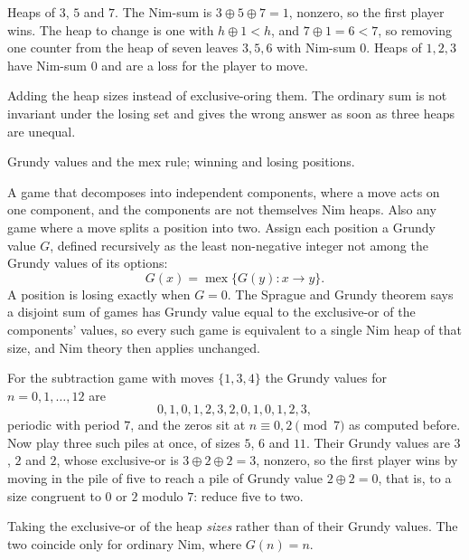 \begin{worked}
Heaps of $3$, $5$ and $7$. The Nim-sum is $3\oplus5\oplus7=1$, nonzero, so the first player wins. The heap to change is one with $h\oplus1<h$, and $7\oplus1=6<7$, so removing one counter from the heap of seven leaves $3,5,6$ with Nim-sum $0$. Heaps of $1,2,3$ have Nim-sum $0$ and are a loss for the player to move.
\end{worked}

\begin{trap}
Adding the heap sizes instead of exclusive-oring them. The ordinary sum is not invariant under the losing set and gives the wrong answer as soon as three heaps are unequal.
\end{trap}

\begin{seealsob}Grundy values and the mex rule; winning and losing positions.\end{seealsob}

\cue A game that decomposes into independent components, where a move acts on one component, and the components are not themselves Nim heaps. Also any game where a move splits a position into two.
\method Assign each position a Grundy value $G$, defined recursively as the least non-negative integer not among the Grundy values of its options:
\[
G(x)=\operatorname{mex}\{G(y): x\to y\}.
\]
A position is losing exactly when $G=0$. The Sprague and Grundy theorem says a disjoint sum of games has Grundy value equal to the exclusive-or of the components' values, so every such game is equivalent to a single Nim heap of that size, and Nim theory then applies unchanged.

\begin{worked}
For the subtraction game with moves $\{1,3,4\}$ the Grundy values for $n=0,1,\ldots,12$ are
\[
0,1,0,1,2,3,2,0,1,0,1,2,3,
\]
periodic with period $7$, and the zeros sit at $n\equiv0,2\pmod7$ as computed before. Now play three such piles at once, of sizes $5$, $6$ and $11$. Their Grundy values are $3$, $2$ and $2$, whose exclusive-or is $3\oplus2\oplus2=3$, nonzero, so the first player wins by moving in the pile of five to reach a pile of Grundy value $2\oplus2=0$, that is, to a size congruent to $0$ or $2$ modulo $7$: reduce five to two.
\end{worked}

\begin{trap}
Taking the exclusive-or of the heap \emph{sizes} rather than of their Grundy values. The two coincide only for ordinary Nim, where $G(n)=n$.
\end{trap}

